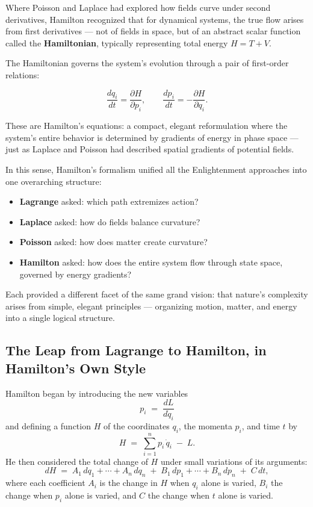 \medskip

Where Poisson and Laplace had explored how fields curve under second derivatives, Hamilton recognized that for dynamical systems, the true flow arises from first derivatives — not of fields in space, but of an abstract scalar function called the \textbf{Hamiltonian}, typically representing total energy \( H = T + V \).

The Hamiltonian governs the system’s evolution through a pair of first-order relations:

\[
\frac{dq_i}{dt} = \frac{\partial H}{\partial p_i},
\qquad
\frac{dp_i}{dt} = -\frac{\partial H}{\partial q_i}.
\]

These are Hamilton’s equations: a compact, elegant reformulation where the system's entire behavior is determined by gradients of energy in phase space — just as Laplace and Poisson had described spatial gradients of potential fields.

\medskip

In this sense, Hamilton’s formalism unified all the Enlightenment approaches into one overarching structure:

\begin{itemize}
    \item \textbf{Lagrange} asked: which path extremizes action?
    \item \textbf{Laplace} asked: how do fields balance curvature?
    \item \textbf{Poisson} asked: how does matter create curvature?
    \item \textbf{Hamilton} asked: how does the entire system flow through state space, governed by energy gradients?
\end{itemize}

Each provided a different facet of the same grand vision: that nature’s complexity arises from simple, elegant principles — organizing motion, matter, and energy into a single logical structure.







\subsection{The Leap from Lagrange to Hamilton, in Hamilton’s Own Style}

Hamilton began by introducing the new variables
\[
p_i \;=\;\frac{dL}{d\dot q_i}
\]
and defining a function \(H\) of the coordinates \(q_i\), the momenta \(p_i\), and time \(t\) by
\[
H \;=\;\sum_{i=1}^n p_i\,\dot q_i \;-\; L.
\]
He then considered the total change of \(H\) under small variations of its arguments:
\[
dH
\;=\;
A_1\,dq_1 + \cdots + A_n\,dq_n
\;+\;
B_1\,dp_1 + \cdots + B_n\,dp_n
\;+\;
C\,dt,
\]
where each coefficient \(A_i\) is the change in \(H\) when \(q_i\) alone is varied, \(B_i\) the change when \(p_i\) alone is varied, and \(C\) the change when \(t\) alone is varied.

